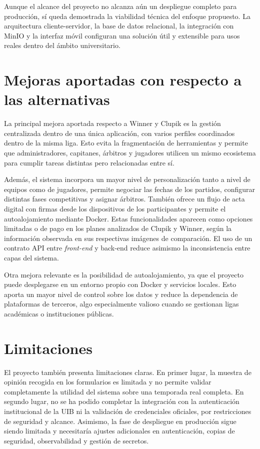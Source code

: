 Aunque el alcance del proyecto no alcanza aún un despliegue completo para producción, sí queda demostrada la viabilidad técnica del enfoque propuesto. La arquitectura cliente-servidor, la base de datos relacional, la integración con MinIO y la interfaz móvil configuran una solución útil y extensible para usos reales dentro del ámbito universitario.

\section{Mejoras aportadas con respecto a las alternativas}

La principal mejora aportada respecto a Winner y Clupik es la gestión centralizada dentro de una única aplicación, con varios perfiles coordinados dentro de la misma liga. Esto evita la fragmentación de herramientas y permite que administradores, capitanes, árbitros y jugadores utilicen un mismo ecosistema para cumplir tareas distintas pero relacionadas entre sí.

Además, el sistema incorpora un mayor nivel de personalización tanto a nivel de equipos como de jugadores, permite negociar las fechas de los partidos, configurar distintas fases competitivas y asignar árbitros. También ofrece un flujo de acta digital con firmas desde los dispositivos de los participantes y permite el autoalojamiento mediante Docker. Estas funcionalidades aparecen como opciones limitadas o de pago en los planes analizados de Clupik y Winner, según la información observada en sus respectivas imágenes de comparación. El uso de un contrato API entre \emph{front-end} y back-end reduce asimismo la inconsistencia entre capas del sistema.

Otra mejora relevante es la posibilidad de autoalojamiento, ya que el proyecto puede desplegarse en un entorno propio con Docker y servicios locales. Esto aporta un mayor nivel de control sobre los datos y reduce la dependencia de plataformas de terceros, algo especialmente valioso cuando se gestionan ligas académicas o instituciones públicas.

\section{Limitaciones}

El proyecto también presenta limitaciones claras. En primer lugar, la muestra de opinión recogida en los formularios es limitada y no permite validar completamente la utilidad del sistema sobre una temporada real completa. En segundo lugar, no se ha podido completar la integración con la autenticación institucional de la UIB ni la validación de credenciales oficiales, por restricciones de seguridad y alcance. Asimismo, la fase de despliegue en producción sigue siendo limitada y necesitaría ajustes adicionales en autenticación, copias de seguridad, observabilidad y gestión de secretos.

